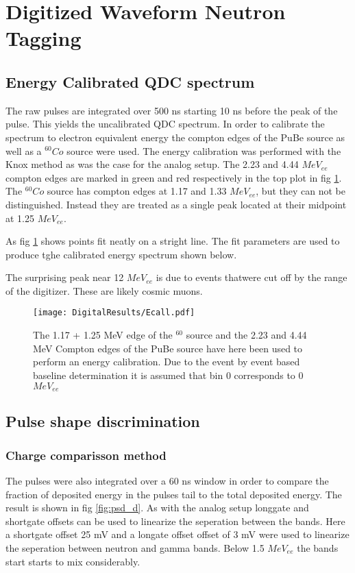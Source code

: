 \documentclass[main.tex]{subfiles}
\begin{document}
\section{Digitized Waveform Neutron Tagging}

\subsection{Energy Calibrated QDC spectrum}
The raw pulses are integrated over 500 ns starting 10 ns before the peak of the pulse. This yields the uncalibrated QDC spectrum. In order to calibrate the spectrum to electron equivalent energy the compton edges of the PuBe source as well as a $^{60}Co$ source were used. The energy calibration was performed with the Knox method as was the case for the analog setup. The 2.23 and 4.44 $MeV_{ee}$ compton edges are marked in green and red respectively in the top plot in fig \ref{fig:D_QDC}. The $^{60}Co$ source has compton edges at 1.17 and 1.33 $MeV_{ee}$, but they can not be distinguished. Instead they are treated as a single peak located at their midpoint at 1.25 $MeV_{ee}$. 

As fig \ref{fig:D_QDC} shows points fit neatly on a stright line. The fit parameters are used to produce tghe calibrated energy spectrum shown below.

The surprising peak near 12 $MeV_{ee}$ is due to events thatwere cut off by the range of the digitizer. These are likely cosmic muons.
\begin{figure}[ht]
    \centering
        \texttt{[image: DigitalResults/Ecall.pdf]}
        \caption{The 1.17 + 1.25 MeV edge of the $^60$ source and the 2.23 and 4.44 MeV Compton edges of the PuBe source have here been used to perform an energy calibration. Due to the event by event based baseline determination it is assumed that bin 0 corresponds to 0 $MeV_{ee}$}
    \label{fig:D_QDC}
\end{figure}



\subsection{Pulse shape discrimination}
\subsubsection{Charge comparisson method}
The pulses were also integrated over a 60 ns window in order to compare the fraction of deposited energy in the pulses tail to the total deposited energy. The result is shown in fig \ref{fig:psd_d}. As with the analog setup longgate and shortgate offsets can be used to linearize the seperation between the bands. Here a shortgate offset 25 mV and a longate offset offset of 3 mV were used to linearize the seperation between neutron and gamma bands. Below 1.5 $MeV_{ee}$ the bands start starts to mix considerably.
\end{document}
